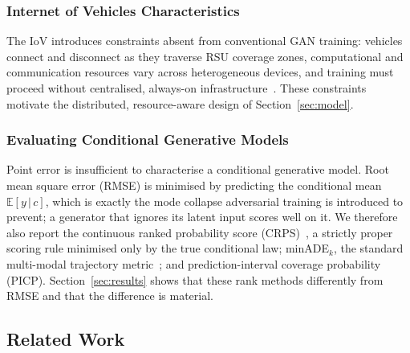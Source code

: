 \documentclass[journal]{IEEEtran}
\begin{document}
\subsubsection{Internet of Vehicles Characteristics}
The IoV introduces constraints absent from conventional GAN training: vehicles
connect and disconnect as they traverse RSU coverage zones, computational and
communication resources vary across heterogeneous devices, and training must
proceed without centralised, always-on
infrastructure~\cite{malektaji2021migration}. These constraints motivate the
distributed, resource-aware design of Section~\ref{sec:model}.

\subsubsection{Evaluating Conditional Generative Models}
Point error is insufficient to characterise a conditional generative model.
Root mean square error (RMSE) is minimised by predicting the conditional mean
$\mathbb{E}[y\,|\,c]$, which is exactly the mode collapse adversarial training
is introduced to prevent; a generator that ignores its latent input scores well
on it. We therefore also report the continuous ranked probability score
(CRPS)~\cite{gneiting2007crps}, a strictly proper scoring rule minimised only
by the true conditional law; minADE$_k$, the standard multi-modal trajectory
metric~\cite{gupta2018socialgan}; and prediction-interval coverage probability
(PICP). Section~\ref{sec:results} shows that these rank methods differently from
RMSE and that the difference is material.

\subsection{Related Work}
\end{document}

